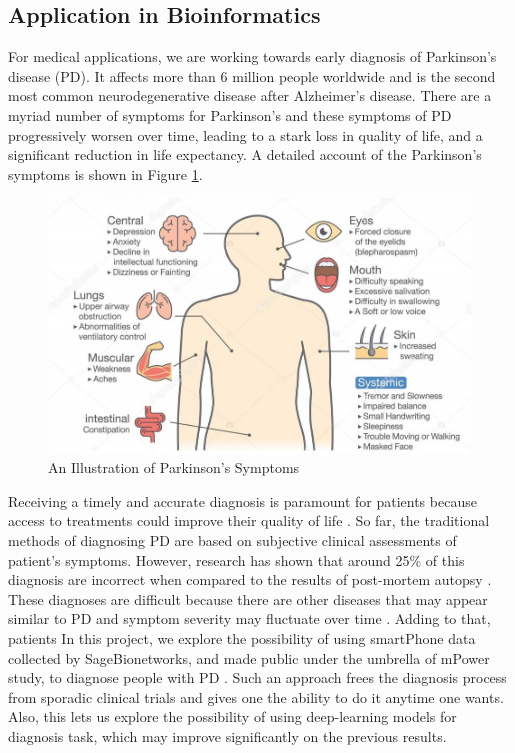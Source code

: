 \subsection{Application in Bioinformatics}
For medical applications, we are working towards early diagnosis of Parkinson’s disease (PD). It affects more than 6 million people worldwide and is the second most common neurodegenerative disease after Alzheimer’s disease. There are a myriad number of symptoms for Parkinson's and these symptoms of PD progressively worsen over time, leading to a stark loss in quality of life, and a significant reduction in life expectancy. A detailed account of the Parkinson's symptoms is shown in Figure \ref{fig:park_symp}.
\begin{figure}[htbp]
  \centering
  \includegraphics[width=\textwidth]{./Figures/park_symp.jpg}
  \caption{An Illustration of Parkinson's Symptoms}
  \label{fig:park_symp}
\end{figure}
Receiving a timely and accurate diagnosis is paramount for patients because access to treatments could improve their quality of life \cite{global2002factors}. So far, the traditional methods of diagnosing PD are based on subjective clinical assessments of patient’s symptoms. However, research has shown that around 25\% of this diagnosis are incorrect when compared to the results of post-mortem autopsy \cite{pahwa2010early}. These diagnoses are difficult because there are other diseases that may appear similar to PD and symptom severity may fluctuate over time \cite{pahwa2010early}. Adding to that, patients In this project, we explore the possibility of using smartPhone data collected by SageBionetworks, and made public under the umbrella of mPower study, to diagnose people with PD \cite{bot2016mpower}. Such an approach frees the diagnosis process from sporadic clinical trials and gives one the ability to do it anytime one wants. Also, this lets us explore the possibility of using deep-learning models for diagnosis task, which may improve significantly on the previous results.
